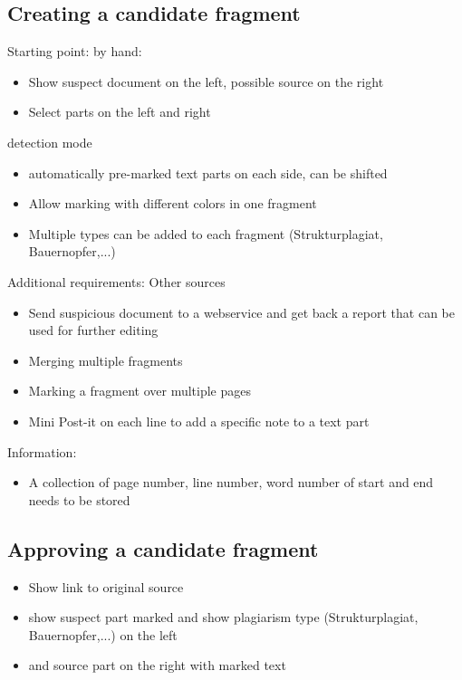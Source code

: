 \subsection{Creating a candidate fragment}

Starting point:
\minisec{}
 by hand:
\begin{itemize}
\item Show suspect document on the left, possible source on the right
\item  Select parts on the left and right
\end{itemize}

detection mode
\begin{itemize}
\item automatically pre-marked text parts on each side, can be shifted
\end{itemize}

\begin{itemize}
\item Allow marking with different colors in one fragment
\item Multiple types can be added to each fragment  (Strukturplagiat, Bauernopfer,...)
\end{itemize}

Additional requirements:
Other sources
\begin{itemize}
\item Send suspicious document to a webservice and get back a report that can be used for further editing 
\item Merging multiple fragments
\item Marking a fragment over multiple pages
\item Mini Post-it on each line to add a specific note to a text part
\end{itemize}

Information:
\begin{itemize}
\item  A collection of page number, line number, word number of start and end  needs to be stored
\end{itemize}

\subsection{Approving a candidate fragment}
\begin{itemize}
\item  Show link to original source
\item show suspect part marked and show plagiarism type (Strukturplagiat, Bauernopfer,...) on the left
\item and source part on the right with marked text
\end{itemize}


